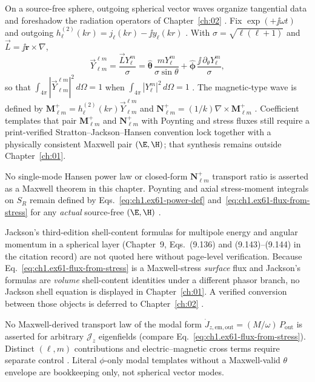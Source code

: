 On a source-free sphere, outgoing spherical vector waves organize tangential data and foreshadow the radiation operators of Chapter~\ref{ch:02} \cite{stratton1941,hansen1988,jackson1999}. Fix $\exp(+\jj\omega t)$ and outgoing $h_\ell^{(2)}(kr)=j_\ell(kr)-\jj y_\ell(kr)$ \cite{stratton1941}. With $\sigma=\sqrt{\ell(\ell+1)}$ and $\vec L=\jj\mathbf r\times\nabla$,
\begin{equation}
\label{eq:ch1.ex61-vsh}
\vec Y_{\ell m}^{\ell m}=\frac{\vec L Y_\ell^m}{\sigma}
=\hat{\boldsymbol{\theta}}\,\frac{m Y_\ell^m}{\sigma\sin\theta}
+\hat{\boldsymbol{\phi}}\,\frac{\jj\,\partial_\theta Y_\ell^m}{\sigma},
\end{equation}
so that $\int_{4\pi}|\vec Y_{\ell m}^{\ell m}|^2\,d\Omega=1$ when $\int_{4\pi}|Y_\ell^m|^2\,d\Omega=1$ \cite{jackson1999}. The magnetic-type wave is defined by $\mathbf M_{\ell m}^+=h_\ell^{(2)}(kr)\vec Y_{\ell m}^{\ell m}$ and $\mathbf N_{\ell m}^+=(1/k)\nabla\times\mathbf M_{\ell m}^+$ \cite{stratton1941,jackson1999}. Coefficient templates that pair $\mathbf M_{\ell m}^+$ and $\mathbf N_{\ell m}^+$ with Poynting and stress fluxes still require a print-verified Stratton--Jackson--Hansen convention lock together with a physically consistent Maxwell pair $(\E,\H)$; that synthesis remains outside Chapter~\ref{ch:01}.

\begin{remark}
\label{rem:ch1.hansen-flux-deferred}
No single-mode Hansen power law or closed-form $\mathbf N_{\ell m}^+$ transport ratio is asserted as a Maxwell theorem in this chapter. Poynting and axial stress-moment integrals on $S_R$ remain defined by Eqs.~\eqref{eq:ch1.ex61-power-def} and~\eqref{eq:ch1.ex61-flux-from-stress} for any \emph{actual} source-free $(\E,\H)$ \cite{stratton1941,jackson1999,hansen1988}.
\end{remark}

Jackson's third-edition shell-content formulas for multipole energy and angular momentum in a spherical layer (Chapter~9, Eqs.~(9.136) and (9.143)--(9.144) in the citation record) are not quoted here without page-level verification. Because Eq.~\eqref{eq:ch1.ex61-flux-from-stress} is a Maxwell-stress \emph{surface} flux and Jackson's formulas are \emph{volume} shell-content identities under a different phasor branch, no Jackson shell equation is displayed in Chapter~\ref{ch:01}. A verified conversion between those objects is deferred to Chapter~\ref{ch:02} \cite{jackson1999}.

\begin{remark}
\label{rem:ch1.am-power-target}
No Maxwell-derived transport law of the modal form
$\dot J_{z,\mathrm{em,out}}=(M/\omega)\,P_{\mathrm{out}}$
is asserted for arbitrary $\mathcal{J}_z$ eigenfields (compare Eq.~\eqref{eq:ch1.ex61-flux-from-stress}). Distinct $(\ell,m)$ contributions and electric--magnetic cross terms require separate control \cite{jackson1999}. Literal $\phi$-only modal templates without a Maxwell-valid $\theta$ envelope are bookkeeping only, not spherical vector modes.
\end{remark}

